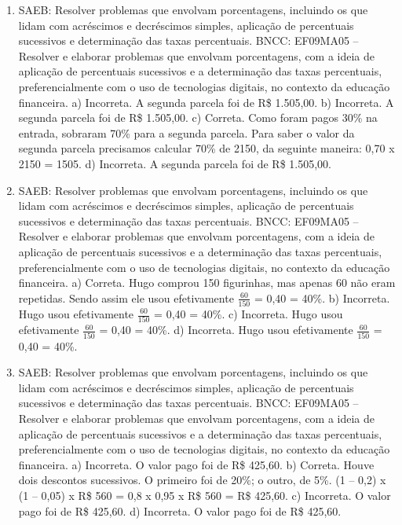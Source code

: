 \begin{enumerate}
\item
SAEB: Resolver problemas que envolvam porcentagens, incluindo os
que lidam com acréscimos e decréscimos simples, aplicação de
percentuais sucessivos e determinação das taxas percentuais.
BNCC: EF09MA05 -- Resolver e elaborar problemas que envolvam porcentagens, com a ideia de aplicação de percentuais sucessivos e a determinação das taxas percentuais, preferencialmente com o uso de tecnologias digitais, no contexto da educação financeira.
a) Incorreta. A segunda parcela foi de R\$ 1.505,00.
b) Incorreta. A segunda parcela foi de R\$ 1.505,00.
c) Correta. Como foram pagos 30\% na entrada, sobraram 70\% para a segunda 
parcela. Para saber o valor da segunda parcela precisamos calcular 70\% de
2150, da seguinte maneira: 0,70 x 2150 = 1505.
d) Incorreta. A segunda parcela foi de R\$ 1.505,00.

\item
SAEB: Resolver problemas que envolvam porcentagens, incluindo os
que lidam com acréscimos e decréscimos simples, aplicação de
percentuais sucessivos e determinação das taxas percentuais.
BNCC: EF09MA05 -- Resolver e elaborar problemas que envolvam porcentagens, com a ideia de aplicação de percentuais sucessivos e a determinação das taxas percentuais, preferencialmente com o uso de tecnologias digitais, no contexto da educação financeira.
a) Correta. Hugo comprou 150 figurinhas, mas apenas 60 não eram repetidas.
Sendo assim ele usou efetivamente $\frac{60}{150}$ = 0,40 = 40\%.
b) Incorreta. Hugo usou efetivamente $\frac{60}{150}$ = 0,40 = 40\%.
c) Incorreta. Hugo usou efetivamente $\frac{60}{150}$ = 0,40 = 40\%.
d) Incorreta. Hugo usou efetivamente $\frac{60}{150}$ = 0,40 = 40\%.

\item
SAEB: Resolver problemas que envolvam porcentagens, incluindo os
que lidam com acréscimos e decréscimos simples, aplicação de
percentuais sucessivos e determinação das taxas percentuais.
BNCC: EF09MA05 -- Resolver e elaborar problemas que envolvam porcentagens, com a ideia de aplicação de percentuais sucessivos e a determinação das taxas percentuais, preferencialmente com o uso de tecnologias digitais, no contexto da educação financeira.
a) Incorreta. O valor pago foi de R\$ 425,60.
b) Correta. Houve dois descontos sucessivos. O primeiro foi de 20\%; o outro,
de 5\%. (1 -- 0,2) x (1 -- 0,05) x R\$ 560 = 0,8 x 0,95 x R\$ 560 = R\$ 425,60.
c) Incorreta. O valor pago foi de R\$ 425,60.
d) Incorreta. O valor pago foi de R\$ 425,60.
\end{enumerate}

